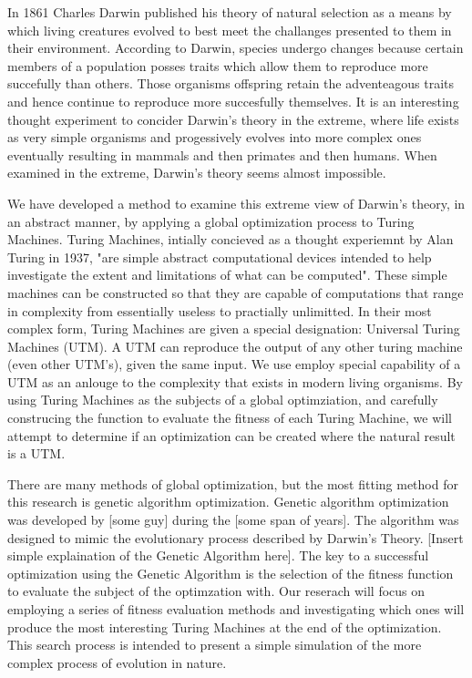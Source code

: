 In 1861 Charles Darwin published his theory of natural selection as a means by which living creatures evolved to best meet the challanges presented to them in their environment. \cite{Origin_of_species} According to Darwin, species undergo changes because certain members of a population posses traits which allow them to reproduce more succefully than others. Those organisms offspring retain the adventeagous traits and hence continue to reproduce more succesfully themselves. It is an interesting thought experiment to concider Darwin's theory in the extreme, where life exists as very simple organisms and progessively evolves into more complex ones eventually resulting in mammals and then primates and then humans. When examined in the extreme, Darwin's theory seems almost impossible. 

We have developed a method to examine this extreme view of Darwin's theory, in an abstract manner, by applying a global optimization process to Turing Machines. Turing Machines, intially concieved as a thought experiemnt by Alan Turing in 1937, "are simple abstract computational devices intended to help investigate the extent and limitations of what can be computed". \cite{SEP_turing} These simple machines can be constructed so that they are capable of computations that range in complexity from essentially useless to practially unlimitted. In their most complex form, Turing Machines are given a special designation: Universal Turing Machines (UTM). A UTM can reproduce the output of any other turing machine (even other UTM's), given the same input. We use employ special capability of a UTM as an anlouge to the complexity that exists in modern living organisms. By using Turing Machines as the subjects of a global optimziation, and carefully construcing the function to evaluate the fitness of each Turing Machine, we will attempt to determine if an optimization can be created where the natural result is a UTM. 

There are many methods of global optimization, but the most fitting method for this research is genetic algorithm optimization. Genetic algorithm optimization was developed by [some guy] during the [some span of years]. The algorithm was designed to mimic the evolutionary process described by Darwin's Theory. [Insert simple explaination of the Genetic Algorithm here]. The key to a successful optimization using the Genetic Algorithm is the selection of the fitness function to evaluate the subject of the optimzation with. Our reserach will focus on employing a series of fitness evaluation methods and investigating which ones will produce the most interesting Turing Machines at the end of the optimization. This search process is intended to present a simple simulation of the more complex process of evolution in nature.
